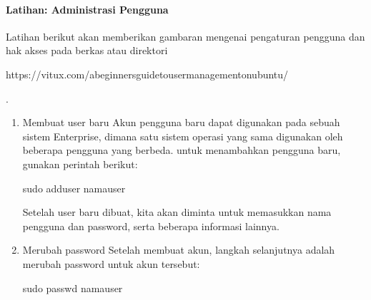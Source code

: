 \documentclass[letterpaper,10pt,english]{sphinxmanual}
\begin{document}
\paragraph{Latihan: Administrasi Pengguna}
\label{\detokenize{sesi1/arsitektur:latihan-administrasi-pengguna}}
Latihan berikut akan memberikan gambaran mengenai pengaturan pengguna dan hak akses pada berkas atau direktori %
\begin{footnote}[3]\sphinxAtStartFootnote
https://vitux.com/a\sphinxhyphen{}beginners\sphinxhyphen{}guide\sphinxhyphen{}to\sphinxhyphen{}user\sphinxhyphen{}management\sphinxhyphen{}on\sphinxhyphen{}ubuntu/
%
\end{footnote}.
\begin{enumerate}
%
\item {} 
Membuat user baru
Akun pengguna baru dapat digunakan pada sebuah sistem Enterprise, dimana satu sistem operasi yang sama digunakan oleh beberapa pengguna yang berbeda. untuk menambahkan pengguna baru, gunakan perintah berikut:

\begin{sphinxVerbatim}[commandchars=\\\{\}]
sudo adduser namauser
\end{sphinxVerbatim}

Setelah user baru dibuat, kita akan diminta untuk memasukkan nama pengguna dan password, serta beberapa informasi lainnya.

\item {} 
Merubah password
Setelah membuat akun, langkah selanjutnya adalah merubah password untuk akun tersebut:

\begin{sphinxVerbatim}[commandchars=\\\{\}]
sudo passwd namauser
\end{sphinxVerbatim}

\end{enumerate}
\end{document}
